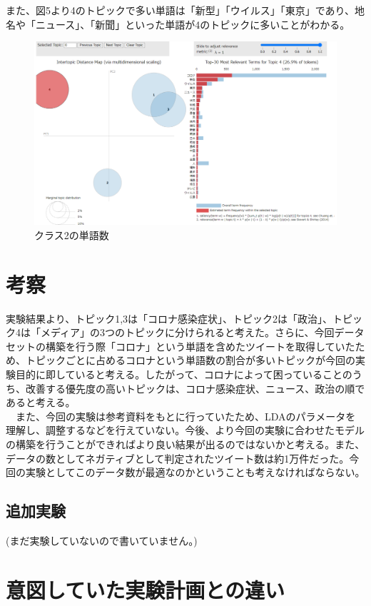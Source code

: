 \documentclass[a4paper, 11pt, titlepage]{jsarticle}
\begin{document}
また、図5より4のトピックで多い単語は「新型」「ウイルス」「東京」であり、地名や「ニュース」、「新聞」といった単語が4のトピックに多いことがわかる。\\
\begin{figure}[H]
  \centering
  \includegraphics[scale=0.25]{picture5.png}
  \caption{クラス2の単語数}
\end{figure}

\section{考察}
実験結果より、トピック1,3は「コロナ感染症状」、トピック2は「政治」、トピック4は「メディア」の3つのトピックに分けられると考えた。さらに、今回データセットの構築を行う際「コロナ」という単語を含めたツイートを取得していたため、トピックごとに占めるコロナという単語数の割合が多いトピックが今回の実験目的に即していると考える。したがって、コロナによって困っていることのうち、改善する優先度の高いトピックは、コロナ感染症状、ニュース、政治の順であると考える。\\

　また、今回の実験は参考資料をもとに行っていたため、LDAのパラメータを理解し、調整するなどを行えていない。今後、より今回の実験に合わせたモデルの構築を行うことができればより良い結果が出るのではないかと考える。また、データの数としてネガティブとして判定されたツイート数は約1万件だった。今回の実験としてこのデータ数が最適なのかということも考えなければならない。

\subsection{追加実験}
(まだ実験していないので書いていません。)

\section{意図していた実験計画との違い}
\end{document}
